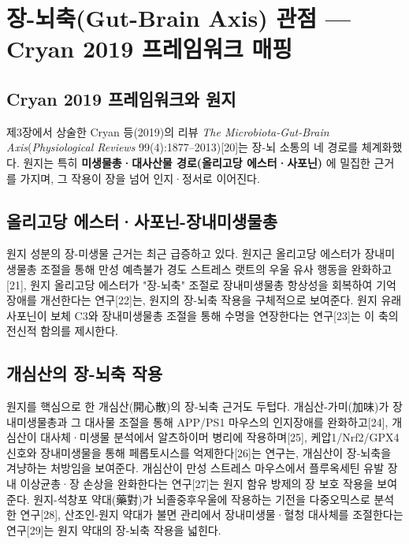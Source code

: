 \documentclass[11pt,oneside]{book}
\begin{document}
\section{장-뇌축(Gut-Brain Axis) 관점 — Cryan 2019 프레임워크 매핑}
\subsection{Cryan 2019 프레임워크와 원지}
제3장에서 상술한 Cryan 등(2019)의 리뷰 \textit{The Microbiota-Gut-Brain Axis}(\textit{Physiological Reviews} 99(4):1877–2013)[20]는 장-뇌 소통의 네 경로를 체계화했다. 원지는 특히 \textbf{미생물총·대사산물 경로(올리고당 에스터·사포닌)} 에 밀집한 근거를 가지며, 그 작용이 장을 넘어 인지·정서로 이어진다.

\subsection{올리고당 에스터·사포닌-장내미생물총}
원지 성분의 장-미생물 근거는 최근 급증하고 있다. 원지근 올리고당 에스터가 장내미생물총 조절을 통해 만성 예측불가 경도 스트레스 랫트의 우울 유사 행동을 완화하고[21], 원지 올리고당 에스터가 "장-뇌축" 조절로 장내미생물총 항상성을 회복하여 기억장애를 개선한다는 연구[22]는, 원지의 장-뇌축 작용을 구체적으로 보여준다. 원지 유래 사포닌이 보체 C3와 장내미생물총 조절을 통해 수명을 연장한다는 연구[23]는 이 축의 전신적 함의를 제시한다.

\subsection{개심산의 장-뇌축 작용}
원지를 핵심으로 한 개심산(開心散)의 장-뇌축 근거도 두텁다. 개심산-가미(加味)가 장내미생물총과 그 대사물 조절을 통해 APP/PS1 마우스의 인지장애를 완화하고[24], 개심산이 대사체·미생물 분석에서 알츠하이머 병리에 작용하며[25], 케압1/Nrf2/GPX4 신호와 장내미생물을 통해 페롭토시스를 억제한다[26]는 연구는, 개심산이 장-뇌축을 겨냥하는 처방임을 보여준다. 개심산이 만성 스트레스 마우스에서 플루옥세틴 유발 장내 이상균총·장 손상을 완화한다는 연구[27]는 원지 함유 방제의 장 보호 작용을 보여준다. 원지-석창포 약대(藥對)가 뇌졸중후우울에 작용하는 기전을 다중오믹스로 분석한 연구[28], 산조인-원지 약대가 불면 관리에서 장내미생물·혈청 대사체를 조절한다는 연구[29]는 원지 약대의 장-뇌축 작용을 넓힌다.
\end{document}
